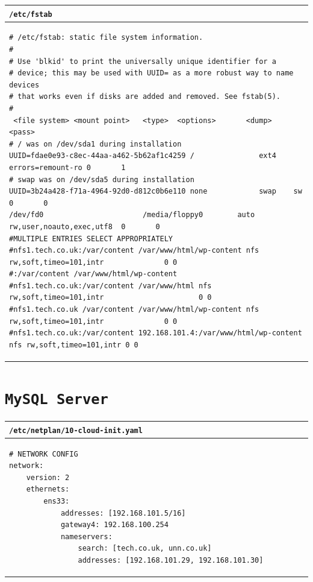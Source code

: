 \documentclass[11pt]{article}
\begin{document}
\begin{table}[ht]
    \begin{tabular}{|p{17.7cm}|} 
        \hline
        \texttt{\textbf{/etc/fstab}}\\ 
        \hline
        \lstset{
                basicstyle=\scriptsize\ttfamily,
              }
              \begin{lstlisting}
# /etc/fstab: static file system information.
#
# Use 'blkid' to print the universally unique identifier for a
# device; this may be used with UUID= as a more robust way to name devices
# that works even if disks are added and removed. See fstab(5).
#
 <file system> <mount point>   <type>  <options>       <dump>  <pass>
# / was on /dev/sda1 during installation
UUID=fdae0e93-c8ec-44aa-a462-5b62af1c4259 /               ext4    errors=remount-ro 0       1
# swap was on /dev/sda5 during installation
UUID=3b24a428-f71a-4964-92d0-d812c0b6e110 none            swap    sw                0       0
/dev/fd0                       /media/floppy0        auto rw,user,noauto,exec,utf8  0       0
#MULTIPLE ENTRIES SELECT APPROPRIATELY
#nfs1.tech.co.uk:/var/content /var/www/html/wp-content nfs  rw,soft,timeo=101,intr              0 0
#:/var/content /var/www/html/wp-content
#nfs1.tech.co.uk:/var/content /var/www/html nfs  rw,soft,timeo=101,intr                      0 0
#nfs1.tech.co.uk /var/content /var/www/html/wp-content nfs  rw,soft,timeo=101,intr              0 0
#nfs1.tech.co.uk:/var/content 192.168.101.4:/var/www/html/wp-content nfs rw,soft,timeo=101,intr 0 0           
        \end{lstlisting}\\
        \hline
    \end{tabular}
\end{table}

\clearpage

\section{\texttt{MySQL Server}}
\begin{table}[ht]
    \begin{tabular}{|p{17.7cm}|} 
        \hline
        \texttt{\textbf{/etc/netplan/10-cloud-init.yaml}}\\ 
        \hline
        \lstset{
                basicstyle=\scriptsize\ttfamily,
              }
              \begin{lstlisting}
# NETWORK CONFIG
network:
    version: 2
    ethernets:
        ens33:
            addresses: [192.168.101.5/16]
            gateway4: 192.168.100.254
            nameservers:
                search: [tech.co.uk, unn.co.uk]
                addresses: [192.168.101.29, 192.168.101.30]                
        \end{lstlisting}\\
        \hline
    \end{tabular}
\end{table}
\end{document}
